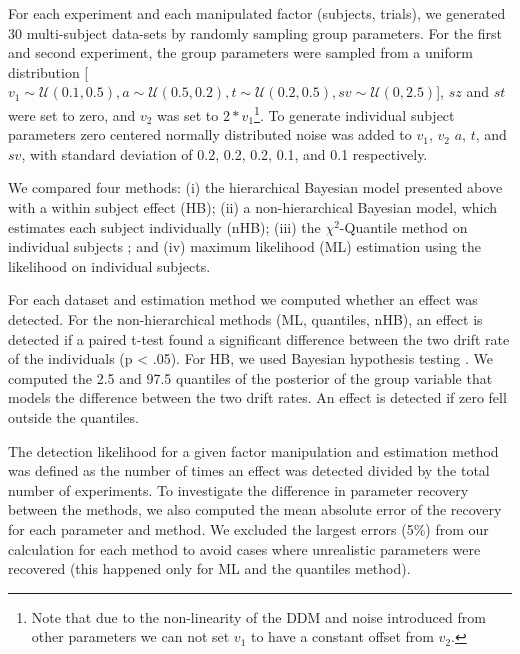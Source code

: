 \documentclass[letterpaper,10pt,english]{article}
\begin{document}
For each experiment and each manipulated factor (subjects, trials), we
generated 30 multi-subject data-sets by randomly sampling group
parameters. For the first and second experiment, the group parameters
were sampled from a uniform distribution [$v_{\text{1}} \sim
\mathcal{U}(0.1, 0.5), a \sim \mathcal{U}(0.5, 0.2), t \sim
\mathcal{U}(0.2, 0.5), sv \sim \mathcal{U}(0, 2.5)$], $sz$ and $st$
were set to zero, and $v_{\text{2}}$ was set to
$2*v_{\text{1}}$\footnote{Note that due to the non-linearity of the
DDM and noise introduced from other parameters we can not set
$v_{\text{1}}$ to have a constant offset from $v_{\text{2}}$.}. To
generate individual subject parameters zero centered normally
distributed noise was added to $v_{\text{1}}$, $v_{\text{2}}$ $a$,
$t$, and $sv$, with standard deviation of 0.2, 0.2,  0.2, 0.1, and 0.1
respectively.

We compared four methods: (i) the hierarchical Bayesian model
presented above with a within subject effect (HB); (ii) a
non-hierarchical Bayesian model, which estimates each subject
individually (nHB); (iii) the $\chi^2$-Quantile method on individual
subjects \citep{RatcliffTuerlinckx02}; and (iv) maximum likelihood
(ML) estimation using the \citet{NavarroFuss09} likelihood on
individual subjects.

For each dataset and estimation method we computed whether an effect
was detected. For the non-hierarchical methods (ML, quantiles, nHB),
an effect is detected if a paired t-test found a significant
difference between the two drift rate of the individuals (p < .05).
For HB, we used Bayesian hypothesis testing
\citep{Lindley65,Kruschke10}. We computed the 2.5 and 97.5 quantiles
of the posterior of the group variable that models the difference
between the two drift rates. An effect is detected if zero fell
outside the quantiles.

The detection likelihood for a given factor manipulation and
estimation method was defined as the number of times an effect was
detected divided by the total number of experiments. To investigate
the difference in parameter recovery between the methods, we also
computed the mean absolute error of the recovery for each parameter
and method. We excluded the largest errors (5\%) from our calculation
for each method to avoid cases where unrealistic parameters were
recovered (this happened only for ML and the quantiles method).
\end{document}

